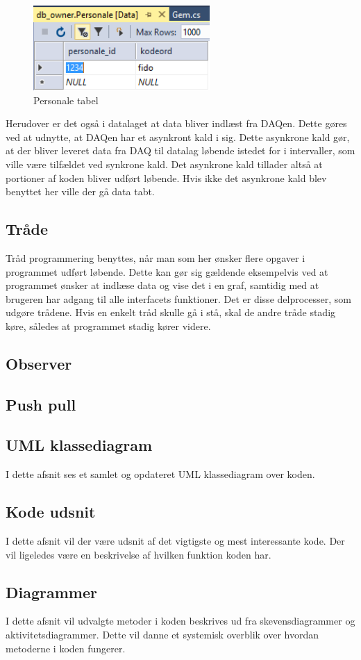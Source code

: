 \begin{figure}[H]
	\centering
	\includegraphics[width=0.6\textwidth]{Figurer/SoftwareImplementering/database}
	\caption{Personale tabel}
	\label{personaletabel}
\end{figure}

Herudover er det også i datalaget at data bliver indlæst fra DAQen. Dette gøres ved at udnytte, at DAQen har et asynkront kald i sig. Dette asynkrone kald gør, at der bliver leveret data fra DAQ til datalag løbende istedet for i intervaller, som ville være tilfældet ved synkrone kald. Det asynkrone kald tillader altså at portioner af koden bliver udført løbende. Hvis ikke det asynkrone kald blev benyttet her ville der gå data tabt. 

\subsection{Tråde}
Tråd programmering benyttes, når man som her ønsker flere opgaver i programmet udført løbende. Dette kan gør sig gældende eksempelvis ved at programmet ønsker at indlæse data og vise det i en graf, samtidig med at brugeren har adgang til alle interfacets funktioner. Det er disse delprocesser, som udgøre trådene. Hvis en enkelt tråd skulle gå i stå, skal de andre tråde stadig køre, således at programmet stadig kører videre. 
\subsection{Observer}
\subsection{Push pull}


\subsection{UML klassediagram}\label{UML klassediagram}
I dette afsnit ses et samlet og opdateret UML klassediagram over koden. 

\subsection{Kode udsnit}
I dette afsnit vil der være udsnit af det vigtigste og mest interessante kode. Der vil ligeledes være en beskrivelse af hvilken funktion koden har.

\subsection{Diagrammer}
I dette afsnit vil udvalgte metoder i koden beskrives ud fra skevensdiagrammer og aktivitetsdiagrammer. Dette vil danne et systemisk overblik over hvordan metoderne i koden fungerer. 

 







